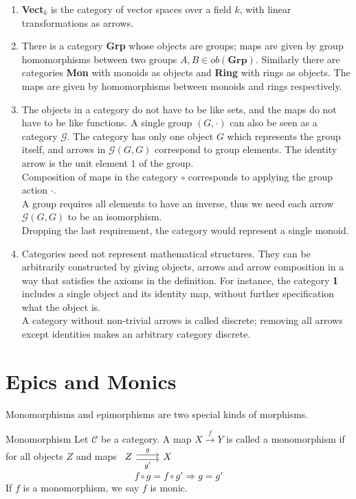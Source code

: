 \begin {enumerate}
  \item \textbf{Vect$_k$} is the category of vector spaces over a field $k$, with linear transformations as arrows.
  
  \item There is a category \textbf{Grp} whose objects are groups; maps are given by group homomorphisms between two groups $A,B \in ob(\textbf{Grp}).$
    Similarly there are categories \textbf{Mon} with monoids as objects and \textbf{Ring} with rings as objects.
    The maps are given by homomorphisms between monoids and rings respectively.
  
  \item
    The objects in a category do not have to be like sets, and the maps do not have to be like functions.
    A single group $(G, \cdot)$ can also be seen as a category $\mathcal{G}$. The category has only one object $G$ which represents the group itself,
    and arrows in $\mathcal{G}(G, G)$  correspond to group elements.
    The identity arrow is the unit element $1$ of the group.\\
    Composition of maps in the category $\circ$ corresponds to applying the group action $\cdot$.\\
    A group requires all elements to have an inverse, thus we need each arrow $\mathcal{G}(G, G)$ to be an isomorphism.\\
    Dropping the last requirement, the category would represent a single monoid.

  
  \item Categories need not represent mathematical structures. They can be arbitrarily constructed by giving objects, arrows and arrow composition in a way that satisfies the axioms in the definition. For instance, the category \textbf{1} includes a single object and its identity map, without further specification what the object is. \\
    A category without non-trivial arrows is called discrete; removing all arrows except identities makes an arbitrary category discrete.
 \end {enumerate}


\section {Epics and Monics}

Monomorphisms and epimorphisms are two special kinds of morphisms.

\begin{definition}{Monomorphism}
  Let $\mathscr{C}$ be a category. A map $X \overset{f}{\to} Y$ is called a monomorphism if for all objects $Z$ and maps
  $
  \begin{tikzcd}
    Z \arrow[r,shift left, "g"] \arrow[r,shift right,swap,"g'"] & X
  \end{tikzcd}
  $
  \[
    f \circ g = f \circ g' \Rightarrow g = g'
  \]
  If $f$ is a monomorphism, we say $f$ is monic.
\end{definition}

